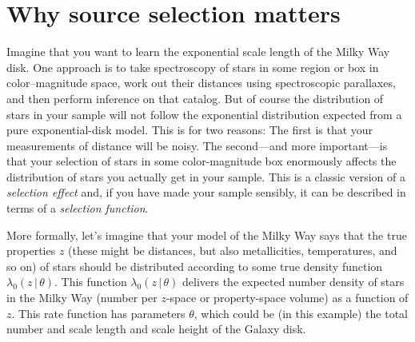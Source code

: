 \documentclass[modern]{aastex62}
\newcommand{\given}{\,|\,}
\begin{document}

\section*{}\clearpage
\section{Why source selection matters}\label{sec:intro}

Imagine that you want to learn the exponential scale length of the
Milky Way disk.
One approach is to take spectroscopy of stars in some region or box in
color--magnitude space, work out their distances using spectroscopic
parallaxes, and then perform inference on that catalog.
But of course the distribution of stars in your sample will not
follow the exponential distribution expected from a pure exponential-disk
model.
This is for two reasons:
The first is that your measurements of distance will be noisy.
The second---and more important---is that your selection of stars in
some color-magnitude box enormously affects the distribution of stars
you actually get in your sample.
This is a classic version of a \emph{selection effect} and, if you
have made your sample sensibly, it can be described in terms of a
\emph{selection function}.

More formally, let's imagine that your model of the Milky Way says
that the true properties $z$ (these might be distances, but also
metallicities, temperatures, and so on) of stars should be distributed
according to some true density function $\lambda_0(z\given\theta)$.
This function $\lambda_0(z\given\theta)$ delivers the expected number
density of stars in the Milky Way (number per $z$-space or property-space volume)
as a function of $z$.
This rate function has parameters $\theta$, which could be (in this
example) the total number and scale length and scale height of the
Galaxy disk.
\end{document}
